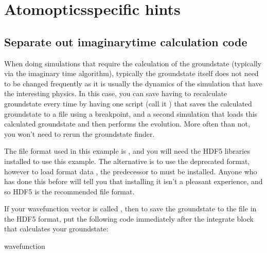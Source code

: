 \documentclass[letterpaper,10pt,english]{sphinxmanual}
\begin{document}
\section{Atom\sphinxhyphen{}optics\sphinxhyphen{}specific hints}
\label{\detokenize{optimisation_hints:atom-optics-specific-hints}}

\subsection{Separate out imaginary\sphinxhyphen{}time calculation code}
\label{\detokenize{optimisation_hints:separate-out-imaginary-time-calculation-code}}
\sphinxAtStartPar
When doing simulations that require the calculation of the groundstate (typically via the imaginary time algorithm), typically the groundstate itself does not need to be changed frequently as it is usually the dynamics of the simulation that have the interesting physics. In this case, you can save having to re\sphinxhyphen{}calculate groundstate every time by having one script (call it ) that saves the calculated groundstate to a file using a breakpoint, and a second simulation that loads this calculated groundstate and then performs the evolution. More often than not, you won’t need to re\sphinxhyphen{}run the groundstate finder.

\sphinxAtStartPar
The file format used in this example is , and you will need the HDF5 libraries installed to use this example. The alternative is to use the deprecated  format, however to load  format data , the predecessor to  must be installed. Anyone who has done this before will tell you that installing it isn’t a pleasant experience, and so HDF5 is the recommended file format.

\sphinxAtStartPar
If your wavefunction vector is called , then to save the groundstate to the file  in the HDF5 format, put the following code immediately after the integrate block that calculates your groundstate:

\begin{sphinxVerbatim}[commandchars=\\\{\}]
  
  wavefunction
\end{sphinxVerbatim}
\end{document}
